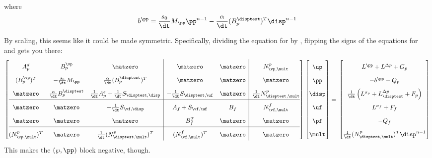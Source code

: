 \documentclass{article}
\begin{document}
where
$$b^{\pp} = \frac {s_0}{\dt} M_{\pp} \pp^{n-1} - \frac {\alpha} {\dt} (B_p^{\disptest})^T \disp^{n-1}$$

By scaling, this seems like it could be made symmetric. Specifically, dividing the equation for \disptest by \dt, flipping the signs of the equations for \wf and \wp gets you there:
\[ \renewcommand{\arraystretch}{1.8}
  \left[\begin{array}{@{}ccc|cc|c@{}}
          
          A^d_p & B^{\vp}_p & \matzero & \matzero & \matzero & N^p_{\vp, \mult} \\ %
          (B^{\vp}_p)^T & -\frac {s_0}{\dt} M_{\pp} & \frac{\alpha}{\dt} (B^{\disptest}_p)^T & \matzero & \matzero & \matzero\\ %
          \matzero & \frac {\alpha} {\dt} B^{\disptest}_p & \frac 1 {\dt}A^e_p + \frac 1 {\dt} S_{\disptest, \disp} & -\frac 1 {\dt} S_{\disptest, \uf} & \matzero &\frac 1 {\dt} N^p_{\disptest, \mult}\\ %
          \hline
          \matzero & \matzero & - \frac 1 {\dt} S_{\vf, \disp} & A_f + S_{\vf, \uf} & B_f & N^f_{\vf, \mult}\\ %
          \matzero & \matzero & \matzero & B_f^T & \matzero & \matzero \\ %
          \hline
          (N^p_{\vp, \mult})^T & \matzero & \frac 1 {\dt} (N^p_{\disptest, \mult})^T & (N^f_{\vf, \mult})^T & \matzero & \matzero \\ %

        \end{array}\right]
      \left[\begin{array}{@{}c@{}}
                \up \\
                \pp \\
                \disp \\
                \uf \\
                \pf \\
                \mult
            \end{array}\right]
          = \newline
                      \left[\begin{array}{@{}c@{}}
                L^{\pp} + L^{\Delta p}  + G_p\\
                              -b^{\pp} - Q_p\\
                              \frac 1 {\dt} \left ( L^{\sigma_p} + L_{\disptest}^{\Delta p} + F_p \right )\\
                L^{\sigma_f} + F_f\\
                - Q_f\\
                \frac 1 {\dt} (N^p_{\disptest, \mult})^T \disp^{n-1} \\
        \end{array}\right]
\]
This makes the $(\wp, \pp)$ block negative, though.
\end{document}
